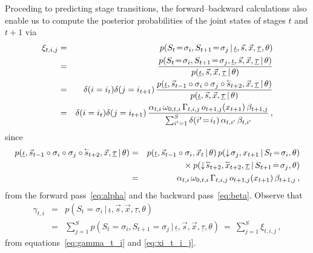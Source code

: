 \documentclass[a4paper]{article}
\newcommand{\rvec}[1]{\accentset{\leftarrow}{#1}}
\newcommand{\dn}{\downarrow\!}
\newcommand{\ui}{\underline{\iota}}
\newcommand{\ut}{\underline{\tau}}
\begin{document}
Proceding to predicting stage transitions, 
the forward--backward calculations also enable us to compute the posterior probabilities of the joint states of stages $t$ and $t+1$ via
\begin{eqnarray}
\xi_{t,i,j} & = &
   p(S_t\!=\!\sigma_i,S_{t+1}\!=\!\sigma_j\,|\,\ui,\vec{s},\vec{x},\ut,\theta)
\nonumber\\& = & 
   \frac{p(S_t\!=\!\sigma_i,S_{t+1}\!=\!\sigma_j,\ui,\vec{s},\vec{x},\ut\,|\,\theta)}
        {p(\ui,\vec{s},\vec{x},\ut\,|\,\theta)}
\nonumber\\& = & 
\delta(i=i_{t})\delta(j=i_{t+1})\,
   \frac{p(\ui,\vec{s}_{t-1}\circ\sigma_{i}\circ\sigma_{j}\circ\rvec{s}_{t+2},\vec{x},\ut\,|\,\theta)}
        {p(\ui,\vec{s},\vec{x},\ut\,|\,\theta)}
\nonumber\\& = & 
\delta(i=i_{t})\delta(j=i_{t+1})\,\frac{\alpha_{t,i}\,\omega_{0,t,i}\,\Gamma_{t,i,j}\,o_{t+1,j}(x_{t+1})\,\beta_{t+1,j}}
{\sum_{i'=1}^S\delta(i'\!=\!i_t)\,\alpha_{t,i'}\,\beta_{t,i'}}\,,
\label{eq:xi_t_i_j}
\end{eqnarray}
since
\begin{eqnarray}
p(\ui,\vec{s}_{t-1}\circ\sigma_{i}\circ\sigma_{j}\circ\rvec{s}_{t+2},\vec{x},\ut\,|\,\theta)
& = &
p(\ui,\vec{s}_{t-1}\circ\sigma_{i},\vec{x}_t\,|\,\theta)\,p(\dn\sigma_j,x_{t+1}\,|\,S_{t}\!=\!\sigma_i,\theta)
\nonumber\\&&{}\times
p(\dn\rvec{s}_{t+2},\rvec{x}_{t+2},\ut\,|\,S_{t+1}\!=\!\sigma_j,\theta)
\nonumber\\& = &
\alpha_{t,i}\,\omega_{0,t,i}\,\Gamma_{t,i,j}\,o_{t+1,j}(x_{t+1})\,\beta_{t+1,j}\,,
\end{eqnarray}
from the forward pass~\eqref{eq:alpha} and the backward pass~\eqref{eq:beta}.
Observe that
\begin{eqnarray}
   \gamma_{t,i} & = & p(S_t\!=\!\sigma_i\,|\,\ui,\vec{s},\vec{x},\ut,\theta)
\nonumber\\& = &
\sum_{j=1}^{S}p(S_t\!=\!\sigma_i,S_{t+1}\!=\!\sigma_j\,|\,\ui,\vec{s},\vec{x},\ut,\theta)
~=~\sum_{j=1}^{S}\xi_{t,i,j}\,,
\label{eq:xi_to_gamma}
\end{eqnarray}
from equations~\eqref{eq:gamma_t_i} and \eqref{eq:xi_t_i_j}.
\end{document}
